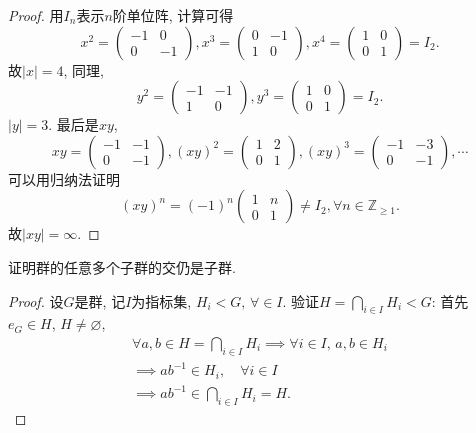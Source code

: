 \begin{proof}
    用$I_n$表示$n$阶单位阵, 计算可得
    \[
        x^2 = \begin{pmatrix}
            -1 & 0 \\
            0 & -1
        \end{pmatrix},
        x^3 = \begin{pmatrix}
            0 & -1 \\
            1 & 0
        \end{pmatrix},
        x^4 = \begin{pmatrix}
            1 & 0 \\
            0 & 1
        \end{pmatrix} = I_2.
    \]
    故$|x| = 4$, 同理,
    \[
        y^2 = \begin{pmatrix}
            -1 & -1 \\
            1 & 0
        \end{pmatrix},
        y^3 = \begin{pmatrix}
            1 & 0 \\
            0 & 1
        \end{pmatrix} = I_2.
    \]
    $|y| = 3$. 最后是$xy$,
    \[
        xy = \begin{pmatrix}
            -1 & -1 \\
            0 & -1
        \end{pmatrix},
        (xy)^2 = \begin{pmatrix}
            1 & 2 \\
            0 & 1
        \end{pmatrix},
        (xy)^3 = \begin{pmatrix}
            -1 & -3 \\
            0 & -1
        \end{pmatrix}, \cdots
    \]
    可以用归纳法证明
    \[
        (xy)^n = (-1)^n
        \begin{pmatrix}
            1 & n \\
            0 & 1
        \end{pmatrix}
        \neq I_2, \forall n \in \mathbb{Z}_{\geqslant 1}.
    \]
    故$|xy| = \infty$.
\end{proof}
    
\begin{problem}
    证明群的任意多个子群的交仍是子群.
\end{problem}

\begin{proof}
    设$G$是群, 记$I$为指标集, $H_i < G,\, \forall \in I$. 验证\(H = \displaystyle\bigcap_{i \in I} H_i < G\): 首先$e_G \in H$, $H \neq \varnothing$,
    \[
    \begin{gathered}
        \forall a, b \in H = \bigcap_{i \in I} H_i \implies \forall i \in I,\,a, b \in H_i\\
        \implies ab^{-1} \in H_i, \quad \forall i \in I\\
        \implies ab^{-1} \in \bigcap_{i \in I} H_i = H.
    \end{gathered}
    \]
\end{proof}


